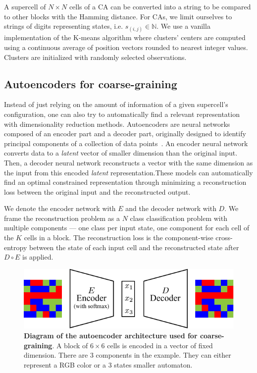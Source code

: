 A supercell of $N\times N$ cells of a CA can be converted into a string to be
compared to other blocks with the Hamming distance. For CAs, we limit ourselves
to strings of digits representing states, i.e. $s_{(i,j)} \in \mathbb{N}$. We
use a vanilla implementation of the K-means algorithm where clusters' centers
are computed using a continuous average of position vectors rounded to nearest
integer values. Clusters are initialized with randomly selected observations.

\subsection{Autoencoders for coarse-graining}

Instead of just relying on the amount of information of a given supercell's
configuration, one can also try to automatically find a relevant representation
with dimensionality reduction methods. Autoencoders are neural networks composed
of an encoder part and a decoder part, originally designed to identify principal
components of a collection of data
points~\parencite{baldiNeuralNetworksPrincipal1989,
  hintonConnectionistLearningProcedures1989,
  kramerNonlinearPrincipalComponent1991}. An encoder neural network converts
data to a \emph{latent} vector of smaller dimension than the original input.
Then, a decoder neural network reconstructs a vector with the same dimension as
the input from this encoded \emph{latent} representation.These models can
automatically find an optimal constrained representation through minimizing a
reconstruction loss between the original input and the reconstructed output.

We denote the encoder network with $E$ and the decoder network with $D$. We frame
the reconstruction problem as a $N$ class classification problem with multiple
components --- one class per input state, one component for each cell of the $K$
cells in a block. The reconstruction loss is the component-wise cross-entropy
between the state of each input cell and the reconstructed state after $D \circ
E$ is applied.

\begin{figure}[th]
  \centering
  \includegraphics[width=\linewidth]{figures/autoencoder.pdf}
  \caption{\label{fig:autoencoder} \textbf{Diagram of the autoencoder
      architecture used for coarse-graining}. A block of $6\times 6$ cells is
    encoded in a vector of fixed dimension. There are 3 components in the
    example. They can either represent a RGB color or a 3 states smaller
    automaton.}
\end{figure}

